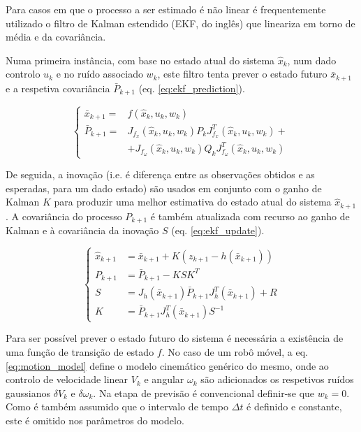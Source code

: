 \documentclass{article}
\begin{document}
Para casos em que o processo a ser estimado é não linear é frequentemente utilizado o filtro de Kalman estendido (EKF, do inglês) que lineariza em torno de média e da covariância.

Numa primeira instância, com base no estado atual do sistema $\hat{x}_k$, num dado controlo $u_k$ e no ruído associado $w_k$, este filtro tenta prever o estado futuro $\bar{x}_{k+1}$ e a respetiva covariância $\bar{P}_{k+1}$ (eq. \ref{eq:ekf_prediction}).

\begin{equation}
    \begin{cases}
        \bar{x}_{k+1} =& f(\hat{x}_k,u_k,w_k) \\
        \bar{P}_{k+1} =& J_{f_x}(\hat{x}_k,u_k,w_k) P_k J_{f_x}^T(\hat{x}_k,u_k,w_k) + \\
        &+J_{f_\omega}(\hat{x}_k,u_k,w_k) Q_k J_{f_\omega}^T(\hat{x}_k,u_k,w_k)
    \end{cases}
    \label{eq:ekf_prediction}
\end{equation}

De seguida, a inovação (i.e. é diferença entre as observações obtidos e as esperadas, para um dado estado) são usados em conjunto com o ganho de Kalman $K$ para produzir uma melhor estimativa do estado atual do sistema $\hat{x}_{k+1}$. A covariância do processo $P_{k+1}$ é também atualizada com recurso ao ganho de Kalman e à covariância da inovação $S$ (eq. \ref{eq:ekf_update}).

\begin{equation}
    \begin{cases}
        \hat{x}_{k+1} &= \bar{x}_{k+1} + K (z_{k+1} - h(\bar{x}_{k+1})) \\
        P_{k+1} &= \bar{P}_{k+1} - KSK^T \\
        S &= J_h(\bar{x}_{k+1}) \bar{P}_{k+1} J_h^T(\bar{x}_{k+1}) + R \\
        K &= \bar{P}_{k+1} J_h^T(\bar{x}_{k+1}) S^{-1}
    \end{cases}
    \label{eq:ekf_update}
\end{equation}

Para ser possível prever o estado futuro do sistema é necessária a existência de uma função de transição de estado $f$. No caso de um robô móvel, a eq. \ref{eq:motion_model} define o modelo cinemático genérico do mesmo, onde ao controlo de velocidade linear $V_k$ e angular $\omega_k$ são adicionados os respetivos ruídos gaussianos $\delta V_k$ e $\delta \omega_k$. Na etapa de previsão é convencional definir-se que $w_k = 0$. Como é também assumido que o intervalo de tempo $\Delta t$ é definido e constante, este é omitido nos parâmetros do modelo.
\end{document}

